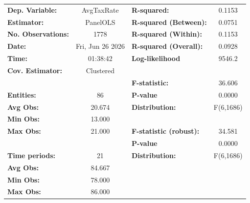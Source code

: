 \begin{center}
\begin{tabular}{lclc}
\toprule
\textbf{Dep. Variable:}                       &     AvgTaxRate     & \textbf{  R-squared:         }   &      0.1153      \\
\textbf{Estimator:}                           &      PanelOLS      & \textbf{  R-squared (Between):}  &      0.0751      \\
\textbf{No. Observations:}                    &        1778        & \textbf{  R-squared (Within):}   &      0.1153      \\
\textbf{Date:}                                &  Fri, Jun 26 2026  & \textbf{  R-squared (Overall):}  &      0.0928      \\
\textbf{Time:}                                &      01:38:42      & \textbf{  Log-likelihood     }   &      9546.2      \\
\textbf{Cov. Estimator:}                      &     Clustered      & \textbf{                     }   &                  \\
\textbf{}                                     &                    & \textbf{  F-statistic:       }   &      36.606      \\
\textbf{Entities:}                            &         86         & \textbf{  P-value            }   &      0.0000      \\
\textbf{Avg Obs:}                             &       20.674       & \textbf{  Distribution:      }   &    F(6,1686)     \\
\textbf{Min Obs:}                             &       13.000       & \textbf{                     }   &                  \\
\textbf{Max Obs:}                             &       21.000       & \textbf{  F-statistic (robust):} &      34.581      \\
\textbf{}                                     &                    & \textbf{  P-value            }   &      0.0000      \\
\textbf{Time periods:}                        &         21         & \textbf{  Distribution:      }   &    F(6,1686)     \\
\textbf{Avg Obs:}                             &       84.667       & \textbf{                     }   &                  \\
\textbf{Min Obs:}                             &       78.000       & \textbf{                     }   &                  \\
\textbf{Max Obs:}                             &       86.000       & \textbf{                     }   &                  \\

\end{tabular}
\end{center}
